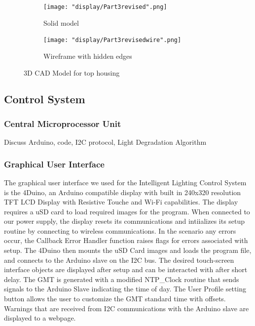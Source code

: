\documentclass[12pt,a4paper]{report}
\begin{document}
\begin{figure}[H]
\centering
\begin{subfigure}{.5\textwidth}
  \centering
  \texttt{[image: "display/Part3revised".png]}
  \caption{Solid model}
  \label{fig:sub1}
\end{subfigure}%
\begin{subfigure}{.5\textwidth}
  \centering
  \texttt{[image: "display/Part3revisedwire".png]}
  \caption{Wireframe with hidden edges}
  \label{fig:sub2}
\end{subfigure}
\caption{3D CAD Model for top housing}
\label{fig:test}

\end{figure}
\newpage


\subsection{Control System}
\blindtext
\subsubsection{Central Microprocessor Unit}
Discuss Arduino, code, I2C protocol, Light Degradation Algorithm

\subsubsection{Graphical User Interface}
The graphical user interface we used for the Intelligent Lighting Control System is the 4Duino, an Arduino compatible display with built in 240x320 resolution TFT LCD Display with Resistive Touche and Wi-Fi capabilities. The display requires a uSD card to load required images for the program. When connected to our power supply, the display resets its communications and intiializes its setup routine by connecting to wireless communications. In the scenario any errors occur, the Callback Error Handler function raises flags for errors associated with setup. The 4Duino then mounts the uSD Card images and loads the program file, and connects to the Arduino slave on the I2C bus. The desired touch-screen interface objects are displayed after setup and can be interacted with after short delay. The GMT is generated with a modified NTP\_Clock routine that sends signals to the Arduino Slave indicating the time of day. The User Profile setting button allows the user to customize the GMT standard time with offsets. Warnings that are received from I2C communications with the Arduino slave are displayed to a webpage.
\end{document}
